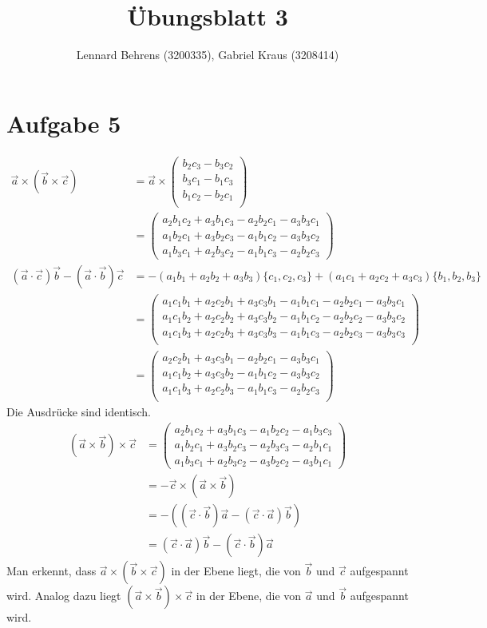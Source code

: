 \documentclass[a4paper,10pt]{extarticle}
\title{Übungsblatt 3}
\author{Lennard Behrens (3200335), Gabriel Kraus (3208414)}
\begin{document}
\maketitle

\section*{Aufgabe 5}
\begin{align*}
  \vec{a} \times (\vec{b} \times \vec{c}) &=
  \vec{a} \times 
  \left(\begin{array}{c}
    b_2 c_3-b_3 c_2\\
    b_3 c_1-b_1 c_3\\
    b_1 c_2-b_2 c_1\\
  \end{array}\right)
  \\&= 
  \left(\begin{array}{c}
    a_2 b_1 c_2+a_3 b_1 c_3-a_2 b_2 c_1-a_3 b_3 c_1\\
    a_1 b_2 c_1+a_3 b_2 c_3-a_1 b_1 c_2-a_3 b_3 c_2\\
    a_1 b_3 c_1+a_2 b_3 c_2-a_1 b_1 c_3-a_2 b_2 c_3
  \end{array}\right)\\
  (\vec{a}\cdot\vec{c})\vec{b}-(\vec{a}\cdot\vec{b})\vec{c}
  &= -(a_1 b_1 + a_2 b_2 + a_3 b_3)\{c_1, c_2, c_3\} + (a_1 c_1 + a_2 c_2 + a_3 c_3)\{b_1, 
  b_2, b_3\}\\
  &=\left(\begin{array}{c}
    a_1 c_1 b_1 + a_2 c_2 b_1 + a_3 c_3 b_1 - a_1 b_1 c_1 - a_2 b_2 c_1 - a_3 b_3 c_1\\
    a_1 c_1 b_2 + a_2 c_2 b_2 + a_3 c_3 b_2 - a_1 b_1 c_2 - a_2 b_2 c_2 - a_3 b_3 c_2\\
    a_1 c_1 b_3 + a_2 c_2 b_3 + a_3 c_3 b_3 - a_1 b_1 c_3 - a_2 b_2 c_3 - a_3 b_3 c_3\\
  \end{array}\right)
  \\&=\left(\begin{array}{c}
    a_2 c_2 b_1 + a_3 c_3 b_1 - a_2 b_2 c_1 - a_3 b_3 c_1\\
    a_1 c_1 b_2 + a_3 c_3 b_2 - a_1 b_1 c_2 - a_3 b_3 c_2\\
    a_1 c_1 b_3 + a_2 c_2 b_3 - a_1 b_1 c_3 - a_2 b_2 c_3\\
  \end{array}\right)
\end{align*}
Die Ausdrücke sind identisch.
\begin{align*}
  (\vec{a}\times\vec{b})\times\vec{c} &=
  \left(\begin{array}{c}
    a_2 b_1 c_2 + a_3 b_1 c_3 - a_1 b_2 c_2 - a_1 b_3 c_3\\
    a_1 b_2 c_1 + a_3 b_2 c_3 - a_2 b_3 c_3 - a_2 b_1 c_1\\
    a_1 b_3 c_1 + a_2 b_3 c_2 - a_3 b_2 c_2 - a_3 b_1 c_1 
  \end{array}\right) \\
  &= -\vec{c}\times(\vec{a}\times\vec{b})\\
  &= -((\vec{c}\cdot\vec{b})\vec{a} - (\vec{c}\cdot\vec{a})\vec{b})\\
  &= (\vec{c}\cdot\vec{a})\vec{b} - (\vec{c}\cdot\vec{b})\vec{a}
\end{align*}
Man erkennt, dass $\vec{a} \times (\vec{b} \times \vec{c})$
in der Ebene liegt, die von $\vec{b}$ und $\vec{c}$ aufgespannt wird.
Analog dazu liegt $(\vec{a}\times\vec{b})\times\vec{c}$ in der Ebene, die von 
$\vec{a}$ und $\vec{b}$ aufgespannt wird.
\end{document}
